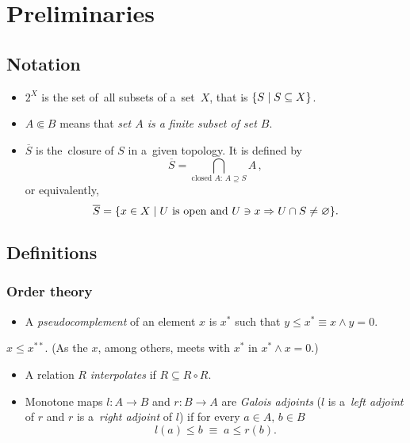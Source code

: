 \chapter{Preliminaries}

\section{Notation}

\begin{itemize}
\item $2^X$ is the set of~all subsets of a~set~$X$, that is $\{ S \mid
S\subseteq X \}$.

\item $A \Subset B$ means that {\sl set $A$ is a finite subset of set $B$\/}.

\item $\overline{S}$ is the~closure of $S$ in a~given topology.
It is defined by
\[
  \overline{S} = \bigcap_{ \text{closed } A\colon \, A\supseteq S} A
  \, ,
\]
or equivalently,
\[
  \overline{S} = \{ x \in X \mid U \text{ is open and } U\owns x \Rightarrow U
  \cap S \ne \varnothing \}.
\]

\end{itemize}

\section{Definitions}

\subsection*{Order theory}

\begin{itemize}
\item A \emph{pseudocomplement} of an element $x$ is $x^*$ such that $y \le x^*
\equiv x \wedge y = 0$.
\end{itemize}

\begin{fact}
  $x \le x^{**}$.
  (As the $x$, among others, meets with $x^*$ in $x^* \wedge x = 0$.)
\end{fact}

\begin{itemize}
\item A relation $R$ \emph{interpolates} if $R \subseteq R \circ R$.

\item Monotone maps $l\colon A \to B$ and $r\colon B \to A$ are \emph{Galois
  adjoints\/} ($l$ is a~\emph{left adjoint\/} of $r$ and $r$ is a~\emph{right
  adjoint\/} of $l$) if for every $a\in A, \, b\in B$
  \[
    l(a) \le b \; \equiv \; a \le r(b).
  \]
\end{itemize}

